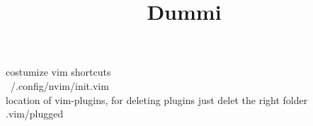 \documentclass[12pt]{article}
\title{Dummi}
\begin{document}
\setlength{\parindent}{0pt}
\setlength{\parskip}{30pt}
\setlength{\baselineskip}{20pt}



costumize vim shortcuts \\
~/.config/nvim/init.vim
\\

location of vim-plugins, for deleting plugins just delet the right folder \\
.vim/plugged
\end{document}
